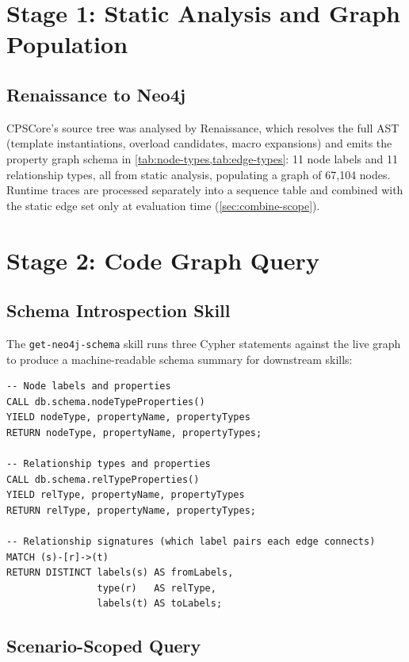 \section{Stage 1: Static Analysis and Graph Population}\label{sec:static-impl}

\subsection{Renaissance to Neo4j}

CPSCore's source tree was analysed by Renaissance, which resolves the
full \ac{AST} (template instantiations, overload candidates, macro
expansions) and emits the property graph schema in
\cref{tab:node-types,tab:edge-types}: 11 node labels and 11 relationship
types, all from static analysis, populating a graph of 67,104 nodes.
Runtime traces are processed separately into a sequence table and
combined with the static edge set only at evaluation time
(\cref{sec:combine-scope}).

\section{Stage 2: Code Graph Query}\label{sec:query-impl}

\subsection{Schema Introspection Skill}

The \texttt{get-neo4j-schema} skill runs three Cypher statements against
the live graph to produce a machine-readable schema summary for
downstream skills:

\begin{verbatim}
-- Node labels and properties
CALL db.schema.nodeTypeProperties()
YIELD nodeType, propertyName, propertyTypes
RETURN nodeType, propertyName, propertyTypes;

-- Relationship types and properties
CALL db.schema.relTypeProperties()
YIELD relType, propertyName, propertyTypes
RETURN relType, propertyName, propertyTypes;

-- Relationship signatures (which label pairs each edge connects)
MATCH (s)-[r]->(t)
RETURN DISTINCT labels(s) AS fromLabels,
                type(r)   AS relType,
                labels(t) AS toLabels;
\end{verbatim}

\subsection{Scenario-Scoped Query}\label{sec:scenario-query-impl}

